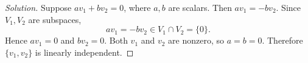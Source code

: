 \begin{proof}[Solution]
  Suppose \(av_1+bv_2=0\), where \(a,b\) are scalars. Then
  \(av_1=-bv_2\). Since \(V_1,V_2\) are subspaces,
  \[
    av_1=-bv_2\in V_1\cap V_2=\{0\}.
  \]
  Hence \(av_1=0\) and \(bv_2=0\). Both \(v_1\) and \(v_2\)
  are nonzero, so \(a=b=0\). Therefore \(\{v_1,v_2\}\) is linearly
  independent.
\end{proof}
